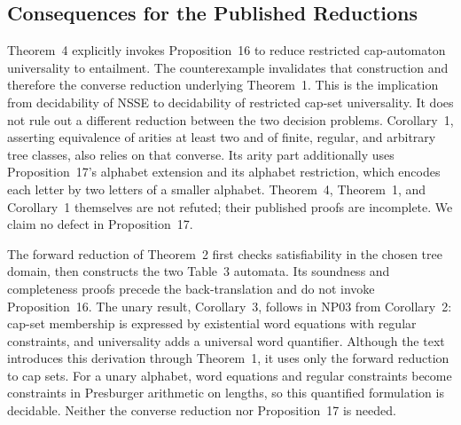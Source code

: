 \subsection{Consequences for the Published Reductions}

Theorem~4 explicitly invokes Proposition~16 to reduce restricted
cap-automaton universality to entailment. The counterexample invalidates
that construction and therefore the converse reduction underlying
Theorem~1. This is the implication from decidability of NSSE to
decidability of restricted cap-set universality. It does not rule out a
different reduction between the two decision problems.
Corollary~1, asserting equivalence of arities at least two and of finite,
regular, and arbitrary tree classes, also relies on that converse.
Its arity part additionally uses Proposition~17's alphabet extension and
its alphabet restriction, which encodes each letter by two letters of a
smaller alphabet. Theorem~4, Theorem~1, and Corollary~1 themselves are
not refuted; their published proofs are incomplete. We claim no defect
in Proposition~17.

The forward reduction of Theorem~2 first checks satisfiability in the
chosen tree domain, then constructs the two Table~3 automata.
Its soundness and completeness proofs precede the back-translation and
do not invoke Proposition~16. The unary result, Corollary~3, follows
in NP03 from Corollary~2: cap-set membership is expressed by existential
word equations with regular constraints, and universality adds a
universal word quantifier. Although the text introduces this derivation
through Theorem~1, it uses only the forward reduction to cap sets.
For a unary alphabet, word equations and regular constraints become
constraints in Presburger arithmetic on lengths, so this quantified
formulation is decidable.
Neither the converse reduction nor Proposition~17 is needed.
